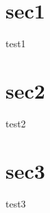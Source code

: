 \documentclass[10pt,a4j,report]{article}
\begin{document}
\section{sec1}
  test1
\section{sec2}
  test2
\section{sec3}
  test3

  
\end{document}
